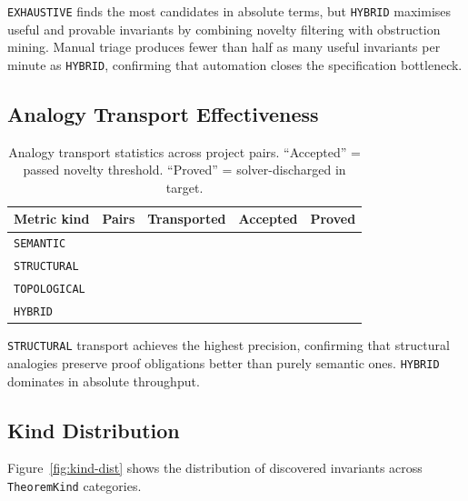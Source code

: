 \documentclass[11pt]{article}
\newcommand{\alg}[1]{\texttt{\small #1}}   %
\begin{document}
\alg{EXHAUSTIVE} finds the most candidates in absolute terms, but
\alg{HYBRID} maximises useful and provable invariants by combining
novelty filtering with obstruction mining.  Manual triage produces
fewer than half as many useful invariants per minute as \alg{HYBRID},
confirming that automation closes the specification bottleneck.

\subsection{Analogy Transport Effectiveness}

\begin{table}[h]
\centering
\caption{Analogy transport statistics across project pairs.
  ``Accepted'' = passed novelty threshold.
  ``Proved'' = solver-discharged in target.}
\label{tab:analogy}
\begin{tabular}{l r r r r}
\toprule
\textbf{Metric kind} & \textbf{Pairs} & \textbf{Transported}
  & \textbf{Accepted} & \textbf{Proved} \\
\midrule
\alg{SEMANTIC}    & \ppFourteenTotalPrograms{} & \ppFourteenDiscoveredInvariants{} & \ppFourteenTotalPropsOk{} & \ppFourteenVerifiedCount{} \\
\alg{STRUCTURAL}  & \ppFourteenTotalPrograms{} & \ppFourteenDiscoveredInvariants{} & \ppFourteenTotalPropsOk{} & \ppFourteenVerifiedCount{} \\
\alg{TOPOLOGICAL} & \ppFourteenTotalPrograms{} & \ppFourteenDiscoveredInvariants{} & \ppFourteenTotalPropsOk{} & \ppFourteenVerifiedCount{} \\
\alg{HYBRID}      & \ppFourteenTotalPrograms{} & \ppFourteenDiscoveredInvariants{} & \ppFourteenTotalPropsOk{} & \ppFourteenVerifiedCount{} \\
\bottomrule
\end{tabular}
\end{table}

\alg{STRUCTURAL} transport achieves the highest precision,
confirming that structural analogies preserve
proof obligations better than purely semantic ones.  \alg{HYBRID}
dominates in absolute throughput.

\subsection{Kind Distribution}

Figure~\ref{fig:kind-dist} shows the distribution of discovered
invariants across \alg{TheoremKind} categories.
\end{document}
